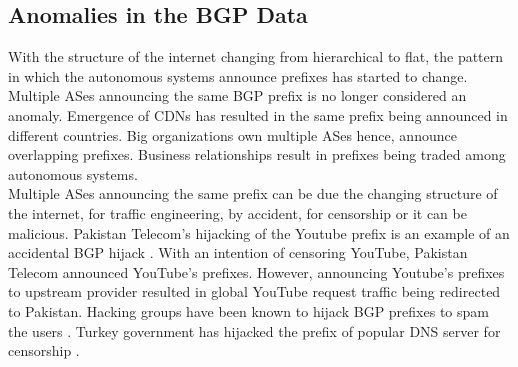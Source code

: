 \subsection{Anomalies in the BGP Data}
With the structure of the internet changing from hierarchical to flat, the pattern in which the autonomous systems announce prefixes has started to change. Multiple ASes announcing the same BGP prefix is no longer considered an anomaly. Emergence of CDNs has resulted in the same prefix being announced in different countries. Big organizations own multiple ASes hence, announce overlapping prefixes. Business relationships result in prefixes being traded among autonomous systems.\\
Multiple ASes announcing the same prefix can be due the changing structure of the internet, for traffic engineering, by accident, for censorship or it can be malicious. Pakistan Telecom's hijacking of the Youtube prefix is an example of an accidental BGP hijack \cite{alshamrani_detecting_2017}. With an intention of censoring YouTube, Pakistan Telecom announced YouTube's prefixes. However, announcing Youtube's prefixes to upstream provider resulted in global YouTube request traffic being redirected to Pakistan. Hacking groups have been known to hijack BGP prefixes to spam the users \cite{Ramachandran:2006:UNB:1159913.1159947}. Turkey government has hijacked the prefix of popular DNS server for censorship \cite{florio_bypassing_2014}.